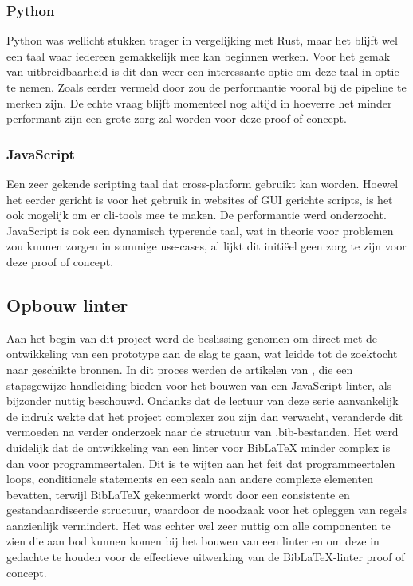 \subsubsection{Python}
Python was wellicht stukken trager in vergelijking met Rust, maar het blijft wel een taal waar iedereen gemakkelijk mee kan beginnen werken. Voor het gemak van uitbreidbaarheid is dit dan weer een interessante optie om deze taal in optie te nemen. Zoals eerder vermeld door \textcite{TurnerTrauring2023} zou de performantie vooral bij de pipeline te merken zijn.
De echte vraag blijft momenteel nog altijd in hoeverre het minder performant zijn een grote zorg zal worden voor deze proof of concept.

\subsubsection{JavaScript}
Een zeer gekende scripting taal dat cross-platform gebruikt kan worden. Hoewel het eerder gericht is voor het gebruik in websites of GUI gerichte scripts, is het ook mogelijk om er cli-tools mee te maken. De performantie werd onderzocht. JavaScript is ook een dynamisch typerende taal, wat in theorie voor problemen zou kunnen zorgen in sommige use-cases, al lijkt dit initiëel geen zorg te zijn voor deze proof of concept.\autocite{MDN2024}

\subsection{Opbouw linter}
Aan het begin van dit project werd de beslissing genomen om direct met de ontwikkeling van een prototype aan de slag te gaan, wat leidde tot de zoektocht naar geschikte bronnen. In dit proces werden de artikelen van \textcite{BorgesLate2021}, die een stapsgewijze handleiding bieden voor het bouwen van een JavaScript-linter, als bijzonder nuttig beschouwd. Ondanks dat de lectuur van deze serie aanvankelijk de indruk wekte dat het project complexer zou zijn dan verwacht, veranderde dit vermoeden na verder onderzoek naar de structuur van .bib-bestanden. Het werd duidelijk dat de ontwikkeling van een linter voor BibLaTeX minder complex is dan voor programmeertalen. Dit is te wijten aan het feit dat programmeertalen loops, conditionele statements en een scala aan andere complexe elementen bevatten, terwijl BibLaTeX gekenmerkt wordt door een consistente en gestandaardiseerde structuur, waardoor de noodzaak voor het opleggen van regels aanzienlijk vermindert. Het was echter wel zeer nuttig om alle componenten te zien die aan bod kunnen komen bij het bouwen van een linter en om deze in gedachte te houden voor de effectieve uitwerking van de BibLaTeX-linter proof of concept.